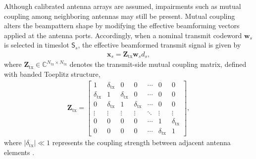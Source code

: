 \documentclass[10pt,journal,compsoc]{IEEEtran}
\theoremstyle{myremark}
\theoremstyle{myexample}
\begin{document}
Although calibrated antenna arrays are assumed, impairments such as mutual coupling among neighboring antennas may still be present. Mutual coupling alters the beampattern shape by modifying the effective beamforming vectors applied at the antenna ports. Accordingly, when a nominal transmit codeword $ \mathbf{w}_{s} $ is selected in timeslot $ \mathsf{S}_s $, the effective beamformed transmit signal is given by
\begin{align}
	\mathbf{x}_s = \mathbf{Z}_\mathrm{tx} \mathbf{w}_s d_s,
\end{align}
where $ \mathbf{Z}_\mathrm{tx} \in \mathbb{C}^{N_\mathrm{tx} \times N_\mathrm{tx}} $ denotes the transmit-side mutual coupling matrix, defined with banded Toeplitz structure,
\begin{align} \label{eqn:coupling-matrix}
	\mathbf{Z}_\mathrm{tx} = 
	\begin{bmatrix}
		1  & \delta_\mathrm{tx} & 0 & 0 & \cdots & 0 & 0
		\\
		\delta_\mathrm{tx}  & 1 & \delta_\mathrm{tx} & 0 & \cdots & 0 & 0		  
		\\
		0 & \delta_\mathrm{tx}  & 1 & \delta_\mathrm{tx} &  \cdots & 0 & 0	
		\\
		\vdots & \vdots & \vdots & \vdots & \ddots & \vdots & \vdots
		\\
		0 & 0 & 0 & 0 & \cdots & 1 & \delta_\mathrm{tx}
		\\
		0 & 0 & 0 & 0 & \cdots & \delta_\mathrm{tx} & 1
	\end{bmatrix},
\end{align}
where $ \left| \delta_\mathrm{tx} \right| \ll 1 $ represents the coupling strength between adjacent antenna elements \cite{wolosinski2020:closed-form-characterization-mutual-coupling-uniform-linear-arrays, pan2022:joint-estimation-doa-mutual-coupling-imposing-annihilation-constraint}. 
\end{document}
